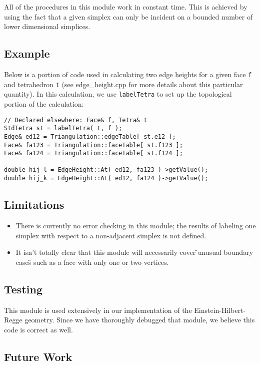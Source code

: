\documentclass[12pt]{article}%
\begin{document}
All of the procedures in this module work in constant time. This is achieved by using the fact that a given simplex can only be incident on a bounded number of lower dimensional simplices.

\subsection*{Example}

Below is a portion of code used in calculating two edge heights for a given face \texttt{f} and tetrahedron \texttt{t} (see edge\_height.cpp for more details about this particular quantity). In this calculation, we use \texttt{labelTetra} to set up the topological portion of the calculation:

\begin{verbatim} 
// Declared elsewhere: Face& f, Tetra& t
StdTetra st = labelTetra( t, f );
Edge& ed12 = Triangulation::edgeTable[ st.e12 ];
Face& fa123 = Triangulation::faceTable[ st.f123 ];
Face& fa124 = Triangulation::faceTable[ st.f124 ];

double hij_l = EdgeHeight::At( ed12, fa123 )->getValue();
double hij_k = EdgeHeight::At( ed12, fa124 )->getValue();
\end{verbatim}

\subsection*{Limitations}

\begin{itemize}\item  There is currently no error checking in this module; the results of labeling one simplex with respect to a non-adjacent simplex is not defined.
\item  It isn't totally clear that this module will necessarily cover \"{}unusual boundary cases\"{} such as a face with only one or two vertices. 
\end{itemize}

\subsection*{Testing}

This module is used extensively in our implementation of the Einstein-Hilbert-Regge geometry. Since we have thoroughly debugged that module, we believe this code is correct as well.

\subsection*{Future Work}
\end{document}
